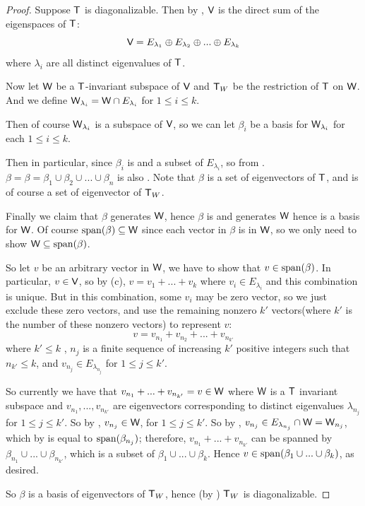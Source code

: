 \begin{proof}
Suppose \(\textsf{T}\) is diagonalizable.
Then by , \(\textsf{V}\) is the direct sum of the eigenspaces of \(\textsf{T}\):
\[
    \textsf{V} = E_{\lambda_1} \oplus E_{\lambda_2} \oplus ... \oplus E_{\lambda_k}
\]
where \(\lambda_i\) are all distinct eigenvalues of \(\textsf{T}\).

Now let \(\textsf{W}\) be a \(\textsf{T}\)-invariant subspace of \(\textsf{V}\) and \(\textsf{T}_W\) be the restriction of \(\textsf{T}\) on \(\textsf{W}\).
And we define \(\textsf{W}_{\lambda_i} = \textsf{W} \cap E_{\lambda_i}\) for \(1 \le i \le k\). 

Then of course \(\textsf{W}_{\lambda_i}\) is a subspace of \(\textsf{V}\), so we can let \(\beta_i\) be a basis for \(\textsf{W}_{\lambda_i}\) for each \(1 \le i \le k\). 

Then in particular, since \(\beta_i\) is \LID{} and a subset of \(E_{\lambda_i}\), so from .
\(\beta = \beta = \beta_1 \cup \beta_2 \cup ... \cup \beta_n\) is also \LID{}.
Note that \(\beta\) is a set of eigenvectors of \(\textsf{T}\), and is of course a set of eigenvector of \(\textsf{T}_W\).

Finally we claim that \(\beta\) generates \(\textsf{W}\), hence \(\beta\) is \LID{} and generates \(\textsf{W}\) hence is a basis for \(\textsf{W}\).
Of course \(\operatorname{span}(\beta) \subseteq \textsf{W}\) since each vector in \(\beta\) is in \(\textsf{W}\), so we only need to show \(\textsf{W} \subseteq \operatorname{span}(\beta)\).

So let \(v\) be an arbitrary vector in \(\textsf{W}\), we have to show that \(v \in \operatorname{span}(\beta)\).
In particular, \(v \in \textsf{V}\), so by (c), \(v = v_1 + ... + v_k\) where \(v_i \in E_{\lambda_i}\) and this combination is unique.
But in this combination, some \(v_i\) may be zero vector, so we just exclude these zero vectors, and use the remaining nonzero \(k'\) vectors(where \(k'\) is the number of these nonzero vectors) to represent \(v\):
\[
    v = v_{n_1} + v_{n_2} + ... + v_{n_{k'}}
\]
where \(k' \le k\) , \(n_j\) is a finite sequence of increasing \(k'\) positive integers such that \(n_{k'} \le k\), and \(v_{n_j} \in E_{\lambda_{n_j}}\) for \(1 \le j \le k'\).

So currently we have that \(v_{n_1} + ... + v_{n_{k'}} = v \in \textsf{W}\) where \(\textsf{W}\) is a \(\textsf{T}\) invariant subspace and \(v_{n_1}, ..., v_{n_{k'}}\) are eigenvectors corresponding to distinct eigenvalues \(\lambda_{n_j}\) for \(1 \le j \le k'\).
So by , \(v_{n_j} \in \textsf{W}\), for \(1 \le j \le k'\).
So by , \(v_{n_j} \in E_{\lambda_{n_j}} \cap \textsf{W} = \textsf{W}_{n_j}\), which by  is equal to \(\operatorname{span}(\beta_{n_j})\);
therefore, \(v_{n_1} + ... + v_{n_{k'}}\) can be spanned by \(\beta_{n_1} \cup ... \cup \beta_{n_{k'}}\), which is a subset of \(\beta_1 \cup ... \cup \beta_k\).
Hence \(v \in \operatorname{span}(\beta_1 \cup ... \cup \beta_k)\), as desired.

So \(\beta\) is a basis of eigenvectors of \(\textsf{T}_W\), hence (by ) \(\textsf{T}_W\) is diagonalizable.
\end{proof}

